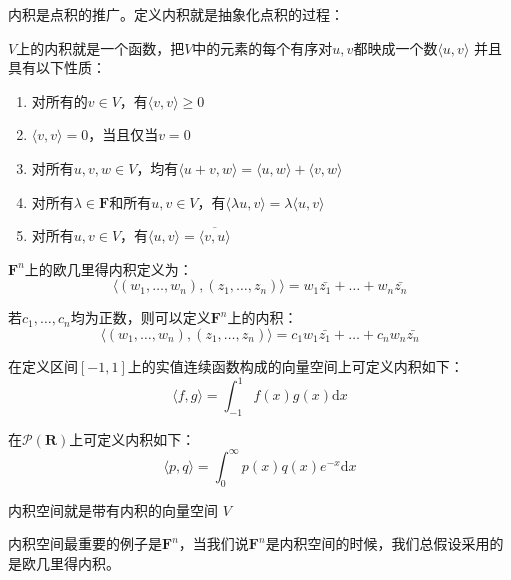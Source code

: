 \documentclass[10pt,a4paper,UTF8]{article}
\begin{document}
内积是点积的推广。定义内积就是抽象化点积的过程：
\begin{definition}
\(V\)上的内积就是一个函数，把\(V\)中的元素的每个有序对\(u,v\)都映成一个数\(\langle u,v \rangle\) 并且具有以下性质：
\begin{enumerate}
\item 对所有的\(v\in V\)，有\(\langle v,v \rangle \geq 0\)
\item \(\langle v,v \rangle =  0\)，当且仅当\(v=0\)
\item 对所有\(u,v,w\in V\)，均有\(\langle u+v,w \rangle = \langle u,w \rangle + \langle v,w \rangle\)
\item 对所有\(\lambda\in \mathbf{F}\)和所有\(u,v\in V\)，有\(\langle \lambda u,v \rangle = \lambda \langle u,v \rangle\)
\item 对所有\(u,v\in V\)，有\(\langle u,v \rangle = \overline{ \langle v,u \rangle }\)
\end{enumerate}
\end{definition}

\begin{instance}
\(\mathbf{F}^{n}\)上的欧几里得内积定义为：
\begin{equation}
\label{eq:3}
\langle (w_{1},\ldots ,w_{n}),(z_{1},\ldots ,z_{n}) \rangle = w_{1}\bar{z_{1}} + \ldots + w_{n}\bar{z_{n}}
\end{equation}
\end{instance}

\begin{instance}
若\(c_{1},\ldots ,c_{n}\)均为正数，则可以定义\(\mathbf{F}^{n}\)上的内积：
\begin{equation}
\label{eq:4}
\langle (w_{1},\ldots ,w_{n}),(z_{1},\ldots ,z_{n}) \rangle = c_{1}w_{1}\bar{z_{1}} + \ldots + c_{n}w_{n}\bar{z_{n}}
\end{equation}
\end{instance}

\begin{instance}
在定义区间\([-1,1]\)上的实值连续函数构成的向量空间上可定义内积如下：
\begin{equation}
\label{eq:5}
\langle f,g \rangle = \int_{-1}^{1}f(x)g(x) \mathrm{d} x
\end{equation}
\end{instance}
\begin{instance}
在\(\mathcal{P}(\mathbf{R})\)上可定义内积如下：
\begin{equation}
\label{eq:6}
\langle p,q \rangle = \int_{0}^{\infty}p(x)q(x)e^{-x} \mathrm{d}x
\end{equation}
\end{instance}
\begin{definition}
内积空间就是带有内积的向量空间 \(V\)
\end{definition}
内积空间最重要的例子是\(\mathbf{F}^{n}\)，当我们说\(\mathbf{F}^{n}\)是内积空间的时候，我们总假设采用的是欧几里得内积。
\end{document}
